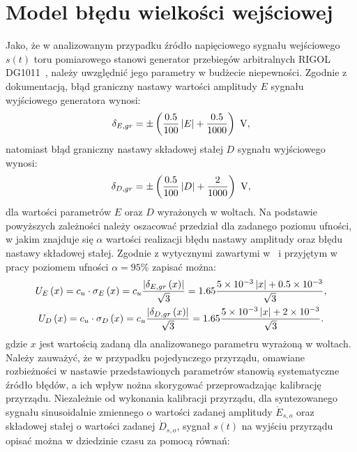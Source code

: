 \section{Model błędu wielkości wejściowej}

Jako, że w analizowanym przypadku źródło napięciowego sygnału wejściowego $s(t)$ toru pomiarowego stanowi generator przebiegów arbitralnych RIGOL DG1011~\cite{rigol_fawg}, należy uwzględnić jego parametry w budżecie niepewności. Zgodnie z dokumentacją, błąd graniczny nastawy wartości amplitudy $E$ sygnału wyjściowego generatora wynosi:
\begin{equation}
\delta_{E,gr} = \pm \emb{\frac{0.5}{100} \left| E \right| + \frac{0.5}{1000}} ~\unit{V} \label{eq:pom_gen_amperr_max},
\end{equation}
natomiast błąd graniczny nastawy składowej stałej $D$ sygnału wyjściowego wynosi:
\begin{equation}
\delta_{D,gr} = \pm \emb{\frac{0.5}{100} \left| D \right| + \frac{2}{1000}} ~\unit{V} \label{eq:pom_gen_shferr_max},
\end{equation}
dla wartości parametrów $E$ oraz $D$ wyrażonych w woltach. Na podstawie powyższych zależności należy oszacować przedział dla zadanego poziomu ufności, w jakim znajduje się $\alpha$ wartości realizacji błędu nastawy amplitudy oraz błędu nastawy składowej stałej. Zgodnie z wytycznymi zawartymi w~\cite{jcgm_guide} i przyjętym w pracy poziomem ufności $\alpha = 95\%$ zapisać można:
\begin{gather}
U_{E} \left(x\right) = c_{u} \cdot \sigma_{E} \left(x\right) = c_{u} \frac{\left| \delta_{E,gr} \left(x\right) \right|}{\sqrt{3}} = 1.65 \frac{\num{5e-3} \left| x \right| + \num{0.5e-3}}{\sqrt{3}} \label{eq:pom_gen_amperr_unc}, \\
U_{D} \left(x\right) = c_{u} \cdot \sigma_{D} \left(x\right) = c_{u} \frac{\left| \delta_{D,gr} \left(x\right) \right|}{\sqrt{3}} = 1.65 \frac{\num{5e-3} \left| x \right| + \num{2e-3}}{\sqrt{3}} \label{eq:pom_gen_shferr_unc}.
\end{gather}
gdzie $x$ jest wartością zadaną dla analizowanego parametru wyrażoną w woltach. Należy zauważyć, że w przypadku pojedynczego przyrządu, omawiane rozbieżności w nastawie przedstawionych parametrów stanowią systematyczne źródło błędów, a ich wpływ nożna skorygować przeprowadzając kalibrację przyrządu. Niezależnie od wykonania kalibracji przyrządu, dla syntezowanego sygnału sinusoidalnie zmiennego o wartości zadanej amplitudy $\dot{E}_{s,o}$ oraz składowej stałej o wartości zadanej $\dot{D}_{s,o}$, sygnał $s(t)$ na wyjściu przyrządu opisać można w dziedzinie czasu za pomocą równań:
